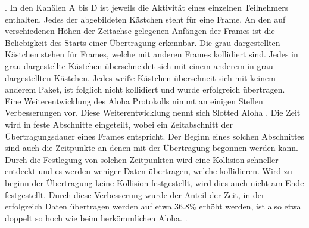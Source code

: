. In den Kanälen A bis D ist jeweils die Aktivität eines einzelnen Teilnehmers enthalten. Jedes der abgebildeten Kästchen steht für eine Frame. An den auf verschiedenen Höhen der Zeitachse gelegenen Anfängen der Frames ist die Beliebigkeit des Starts einer Übertragung erkennbar. Die grau dargestellten Kästchen stehen für Frames, welche mit anderen Frames kollidiert sind. Jedes in grau dargestellte Kästchen überschneidet sich mit einem anderem in grau dargestellten Kästchen. Jedes weiße Kästchen überschneit sich mit keinem anderem Paket, ist folglich nicht kollidiert und wurde erfolgreich übertragen.\\
Eine Weiterentwicklung des Aloha Protokolls nimmt an einigen Stellen Verbesserungen vor. Diese Weiterentwicklung nennt sich Slotted Aloha \cite{Back_AlohaPure}. Die Zeit wird in feste Abschnitte eingeteilt, wobei ein Zeitabschnitt der Übertragungsdauer eines Frames entspricht. Der Beginn eines solchen Abschnittes sind auch die Zeitpunkte an denen mit der Übertragung begonnen werden kann. Durch die Festlegung von solchen Zeitpunkten wird eine Kollision schneller entdeckt und es werden weniger Daten übertragen, welche kollidieren. Wird zu beginn der Übertragung keine Kollision festgestellt, wird dies auch nicht am Ende festgestellt. Durch diese Verbesserung wurde der Anteil der Zeit, in der erfolgreich Daten übertragen werden auf etwa 36.8\% erhöht werden, ist also etwa doppelt so hoch wie beim herkömmlichen Aloha. \cite{Back_AlohaPure}.

